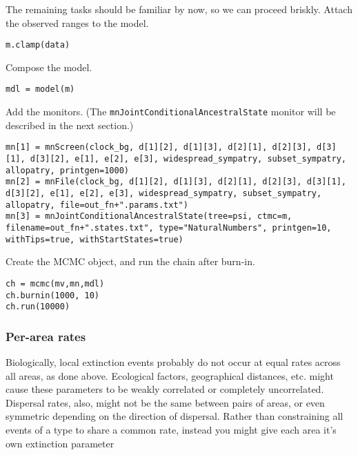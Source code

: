 The remaining tasks should be familiar by now, so we can proceed briskly. Attach the observed ranges to the model.

\begin{snugshade}
\begin{lstlisting}
m.clamp(data)
\end{lstlisting}
\end{snugshade}

Compose the model.

\begin{snugshade}
\begin{lstlisting}
mdl = model(m)
\end{lstlisting}
\end{snugshade}

Add the monitors. (The {\tt mnJointConditionalAncestralState} monitor will be described in the next section.)

\begin{snugshade}
\begin{lstlisting}
mn[1] = mnScreen(clock_bg, d[1][2], d[1][3], d[2][1], d[2][3], d[3][1], d[3][2], e[1], e[2], e[3], widespread_sympatry, subset_sympatry, allopatry, printgen=1000)
mn[2] = mnFile(clock_bg, d[1][2], d[1][3], d[2][1], d[2][3], d[3][1], d[3][2], e[1], e[2], e[3], widespread_sympatry, subset_sympatry, allopatry, file=out_fn+".params.txt")
mn[3] = mnJointConditionalAncestralState(tree=psi, ctmc=m, filename=out_fn+".states.txt", type="NaturalNumbers", printgen=10, withTips=true, withStartStates=true)
\end{lstlisting}
\end{snugshade}

Create the MCMC object, and run the chain after burn-in.
\begin{snugshade}
\begin{lstlisting}
ch = mcmc(mv,mn,mdl)
ch.burnin(1000, 10)
ch.run(10000)
\end{lstlisting}
\end{snugshade}

\subsubsection{Per-area rates}

Biologically, local extinction events probably do not occur at equal rates across all areas, as done above.
Ecological factors, geographical distances, etc. might cause these parameters to be weakly correlated or completely uncorrelated.
Dispersal rates, also, might not be the same between pairs of areas, or even symmetric depending on the direction of dispersal.
Rather than constraining all events of a type to share a common rate, instead you might give each area it's own extinction parameter

